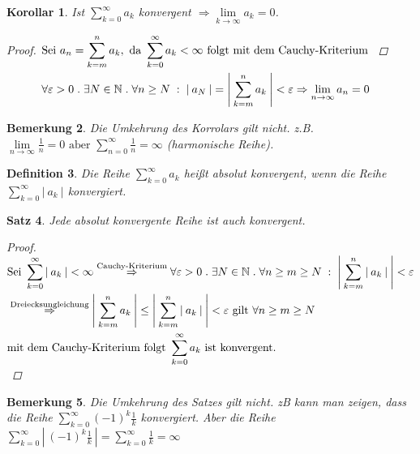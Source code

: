 \documentclass[a4paper,titlepage,oneside]{article}
\def\N{\ensuremath{\mathbb{N}} }
\renewcommand{\epsilon}{\ensuremath{\varepsilon} }
\def\sp{\hspace{0,1cm}}
\def\spdot{\sp.\sp}
\def\spcolon{\sp:\sp}
\newcommand{\suminf}[2][n]{\ensuremath{\sum_{#1= 0}^{\infty}{#2}}}
\renewcommand{\liminf}[2][n]{\ensuremath{\lim\limits_{#1 \rightarrow \infty}{#2}}}
\newcommand{\abs}[1]{\ensuremath{\left|\:#1\:\right|}}
\theoremstyle{thmstyle}
\newtheorem{satz}{Satz}[section]
\newtheorem{korr}[satz]{Korollar}
\newtheorem{defi}[satz]{Definition}
\newtheorem{bem}[satz]{Bemerkung}
\theoremstyle{subthmstyle}
\begin{document}
\begin{korr}
Ist \suminf[k]{a_k} konvergent \(\Rightarrow \liminf[k]{a_k} = 0\).
\begin{proof}
\begin{math}\displaystyle \begin{aligned}[t]
&\text{Sei } a_n = \sum_{k = m}^{n}{a_k}, \text{ da } \suminf[k]{a_k} < \infty \text{ folgt mit dem Cauchy-Kriterium }\\
&\forall \epsilon > 0 \spdot \exists N \in \N \spdot \forall n \ge N \spcolon \abs{a_N} = \abs{ \sum_{k = m}^{n}{a_k}} < \epsilon \Rightarrow \liminf{a_n} = 0\\
\end{aligned}\end{math} 
\end{proof}
\end{korr}

\begin{bem}
Die Umkehrung des Korrolars gilt nicht. z.B. \(\liminf{\frac{1}{n}} = 0 \text{ aber } \suminf{\frac{1}{n}} = \infty \) (harmonische Reihe).
\end{bem}

\begin{defi}
Die Reihe \suminf[k]{a_k} heißt absolut konvergent, wenn die Reihe \suminf[k]{\abs{a_k}} konvergiert.
\end{defi}

\begin{satz}
Jede absolut konvergente Reihe ist auch konvergent.
\begin{proof}
\begin{math}\displaystyle \begin{aligned}[t]
&\text{Sei }\suminf[k]{\abs{a_k}} < \infty  \overset{\text{Cauchy-Kriterium}}{\Rightarrow} \forall \epsilon > 0 \spdot \exists N \in \N \spdot \forall n \ge m \ge N \spcolon \abs{\sum_{k=m}^{n}{\abs{a_k}}} < \epsilon \\
&\overset{\text{Dreiecksungleichung}}{\Rightarrow} \abs{\sum_{k=m}^{n}{a_k}} \le \abs{\sum_{k=m}^{n}{\abs{a_k}}} < \epsilon \text{ gilt } \forall n \ge m \ge N \\
&\text{mit dem Cauchy-Kriterium folgt } \suminf[k]{a_k}\text{ ist konvergent.}
\end{aligned}\end{math} 
\end{proof}
\end{satz}

\begin{bem}
Die Umkehrung des Satzes gilt nicht. zB kann man zeigen, dass die Reihe \(\suminf[k]{(-1)^k\frac{1}{k}}\) konvergiert. Aber die Reihe \(\suminf[k]{\abs{(-1)^k\frac{1}{k}}} = \suminf[k]{\frac{1}{k}} = \infty\)
\end{bem}
\end{document}

